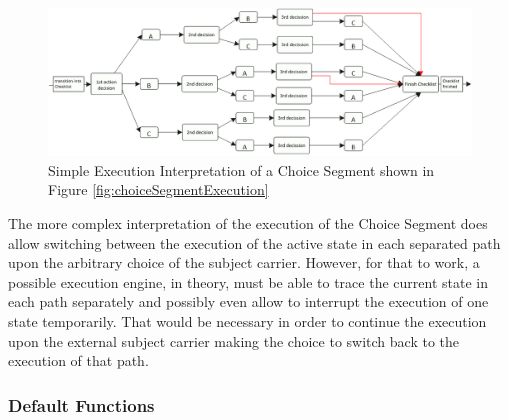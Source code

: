 \begin{figure}[htbp]
	\centering
	\includegraphics[width=0.9\linewidth]{Figures/Ontology/SubjectBehavior/ChoiceSegmentInterpretation.png}
	\caption[Simple Execution Interpretation of a Choice Segment shown in Figure \ref{fig:choiceSegmentExecution}]{Simple Execution Interpretation of a Choice Segment shown in Figure \ref{fig:choiceSegmentExecution}}
	\label{fig:choiceSegmentExecutionInterpretation}
\end{figure}

The more complex interpretation of the execution of the Choice Segment does allow switching between the execution of the active state in each separated path upon the arbitrary choice of the subject carrier. However, for that to work, a possible execution engine, in theory, must be able to trace the current state in each path separately and possibly even allow to interrupt the execution of one state temporarily. That would be necessary in order to continue the execution upon the external subject carrier making the choice to switch back to the execution of that path. 


\subsubsection{Default Functions}





